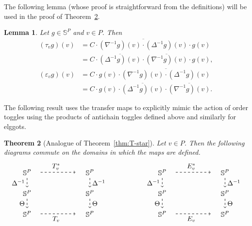 \documentclass[10pt]{amsart}
\newtheorem{theo}{Theorem}[section]
\newtheorem{lemm}[theo]{Lemma}
\theoremstyle{definition}
\newcommand{\bbs}{\mathbb{S}}
\newcommand{\e}{\varepsilon}
\newcommand{\down}{\nabla}
\newcommand{\up}{\Delta}
\begin{document}
The following lemma (whose proof is straightforward from the definitions) will be used in the proof of Theorem~\ref{thm:T-star-NC}.

\begin{lemm}\label{lem:meteor gorge}
Let $g\in\bbs^P$ and $v\in P$.
Then
\begin{align*}
 (\tau_v g)(v)&=C\cdot \overline{(\down^{-1}g)(v)\cdot (\up^{-1}g)(v)} \cdot g(v)\\
 &=C\cdot \overline{(\up^{-1}g)(v)} \cdot \overline{(\down^{-1}g)(v)}\cdot g(v),\\
 (\e_v g)(v)&=C\cdot g(v)\cdot \overline{(\down^{-1}g)(v)\cdot (\up^{-1}g)(v)}\\
 &=C\cdot g(v) \cdot \overline{(\up^{-1}g)(v)} \cdot \overline{(\down^{-1}g)(v)}. 
\end{align*}
\end{lemm}
The following result uses the transfer maps to explicitly mimic the action of order toggles using the products of antichain toggles defined above and similarly for elggots.
\begin{theo}[Analogue of Theorem~\ref{thm:T-star}]\label{thm:T-star-NC}
Let $v\in P$. Then the following diagrams commute on the domains in which the maps are defined.
\[%
\begin{tikzpicture}[yscale=.6]
\node at (0,1.8) {$\bbs^P$};
\node at (0,0) {$\bbs^P$};
\node at (0,-1.8) {$\bbs^P$};
\node at (3.25,1.8) {$\bbs^P$};
\node at (3.25,0) {$\bbs^P$};
\node at (3.25,-1.8) {$\bbs^P$};
\draw[semithick, dashed, ->] (0,1.3) -- (0,0.5);
\node[left] at (0,0.9) {$\up^{-1}$};
\draw[semithick, dashed, ->] (0.7,-1.8) -- (2.5,-1.8);
\node[below] at (1.5,-1.8) {$T_v$};
\draw[semithick, dashed, ->] (0.7,1.8) -- (2.5,1.8);
\node[above] at (1.5,1.8) {$T_v^*$};
\draw[semithick, dashed, ->] (3.25,1.3) -- (3.25,0.5);
\node[right] at (3.25,0.9) {$\up^{-1}$};
\draw[semithick, dashed, ->] (0,-0.5) -- (0,-1.3);
\node[left] at (0,-0.9) {$\Theta$};
\draw[semithick, dashed, ->] (3.25,-0.5) -- (3.25,-1.3);
\node[right] at (3.25,-0.9) {$\Theta$};
\begin{scope}[shift=({7,0})]
\node at (0,1.8) {$\bbs^P$};
\node at (0,0) {$\bbs^P$};
\node at (0,-1.8) {$\bbs^P$};
\node at (3.25,1.8) {$\bbs^P$};
\node at (3.25,0) {$\bbs^P$};
\node at (3.25,-1.8) {$\bbs^P$};
\draw[semithick, dashed, ->] (0,1.3) -- (0,0.5);
\node[left] at (0,0.9) {$\up^{-1}$};
\draw[semithick, dashed, ->] (0.7,-1.8) -- (2.5,-1.8);
\node[below] at (1.5,-1.8) {$E_v$};
\draw[semithick, dashed, ->] (0.7,1.8) -- (2.5,1.8);
\node[above] at (1.5,1.8) {$E_v^*$};
\draw[semithick, dashed, ->] (3.25,1.3) -- (3.25,0.5);
\node[right] at (3.25,0.9) {$\up^{-1}$};
\draw[semithick, dashed, ->] (0,-0.5) -- (0,-1.3);
\node[left] at (0,-0.9) {$\Theta$};
\draw[semithick, dashed, ->] (3.25,-0.5) -- (3.25,-1.3);
\node[right] at (3.25,-0.9) {$\Theta$};
\end{scope}
\end{tikzpicture}
\]
\end{theo}
\end{document}
